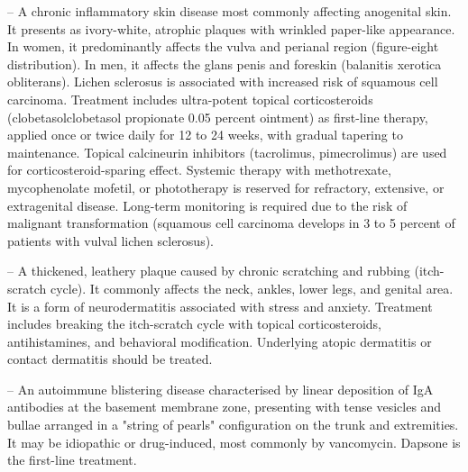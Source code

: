 -- A chronic inflammatory skin disease most commonly affecting anogenital skin. It presents as ivory-white, atrophic plaques with wrinkled paper-like appearance. In women, it predominantly affects the vulva and perianal region (figure-eight distribution). In men, it affects the glans penis and foreskin (balanitis xerotica obliterans). Lichen sclerosus is associated with increased risk of squamous cell carcinoma. Treatment includes ultra-potent topical corticosteroids (clobetasolclobetasol propionate 0.05 percent ointment) as first-line therapy, applied once or twice daily for 12 to 24 weeks, with gradual tapering to maintenance. Topical calcineurin inhibitors (tacrolimus, pimecrolimus) are used for corticosteroid-sparing effect. Systemic therapy with methotrexate, mycophenolate mofetil, or phototherapy is reserved for refractory, extensive, or extragenital disease. Long-term monitoring is required due to the risk of malignant transformation (squamous cell carcinoma develops in 3 to 5 percent of patients with vulval lichen sclerosus).

-- A thickened, leathery plaque caused by chronic scratching and rubbing (itch-scratch cycle). It commonly affects the neck, ankles, lower legs, and genital area. It is a form of neurodermatitis associated with stress and anxiety. Treatment includes breaking the itch-scratch cycle with topical corticosteroids, antihistamines, and behavioral modification. Underlying atopic dermatitis or contact dermatitis should be treated.

-- An autoimmune blistering disease characterised by linear deposition of IgA antibodies at the basement membrane zone, presenting with tense vesicles and bullae arranged in a "string of pearls" configuration on the trunk and extremities. It may be idiopathic or drug-induced, most commonly by vancomycin. Dapsone is the first-line treatment.

